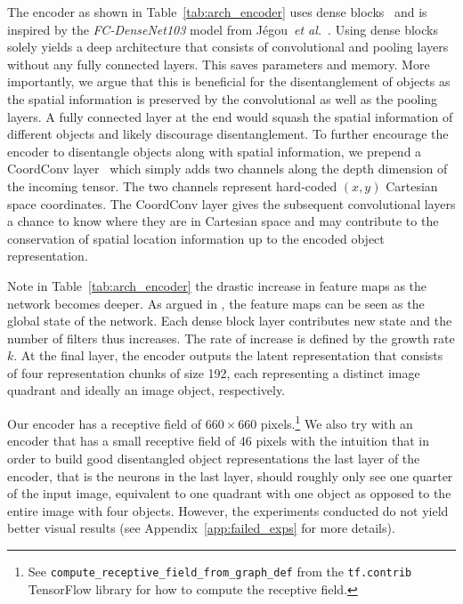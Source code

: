 \documentclass[a4paper,12pt]{report}
\begin{document}
The encoder as shown in Table~\ref{tab:arch_encoder} uses dense blocks~\cite{DenseNet} and is inspired by the \textit{FC-DenseNet103} model from Jégou~\textit{et al.}~\cite{Tiramisu}. Using dense blocks solely yields a deep architecture that consists of convolutional and pooling layers without any fully connected layers. This saves parameters and memory. More importantly, we argue that this is beneficial for the disentanglement of objects as the spatial information is preserved by the convolutional as well as the pooling layers. A fully connected layer at the end would squash the spatial information of different objects and likely discourage disentanglement. To further encourage the encoder to disentangle objects along with spatial information, we prepend a CoordConv layer~\cite{CoordConv} which simply adds two channels along the depth dimension of the incoming tensor. The two channels represent hard-coded $(x,y)$ Cartesian space coordinates. The CoordConv layer gives the subsequent convolutional layers a chance to know where they are in Cartesian space and may contribute to the conservation of spatial location information up to the encoded object representation. 

Note in Table~\ref{tab:arch_encoder} the drastic increase in feature maps as the network becomes deeper. As argued in \cite{DenseNet}, the feature maps can be seen as the global state of the network. Each dense block layer contributes new state and the number of filters thus increases. The rate of increase is defined by the growth rate $k$. At the final layer, the encoder outputs the latent representation that consists of four representation chunks of size 192, each representing a distinct image quadrant and ideally an image object, respectively.

Our encoder has a receptive field of $660 \times 660$ pixels.\footnote{See \texttt{compute\_receptive\_field\_from\_graph\_def} from the \texttt{tf.contrib} TensorFlow library for how to compute the receptive field.} We also try with an encoder that has a small receptive field of 46 pixels with the intuition that in order to build good disentangled object representations the last layer of the encoder, that is the neurons in the last layer, should roughly only see one quarter of the input image, equivalent to one quadrant with one object as opposed to the entire image with four objects. However, the experiments conducted do not yield better visual results (see Appendix~\ref{app:failed_exps} for more details).
\end{document}
